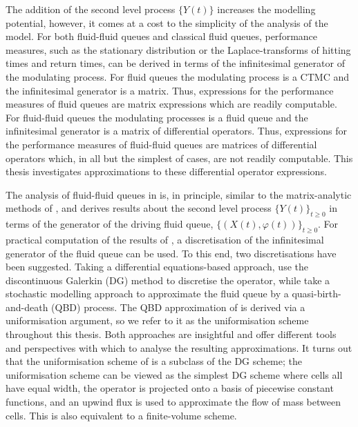 The addition of the second level process \(\{Y(t)\}\) increases the modelling potential, however, it comes at a cost to the simplicity of the analysis of the model. For both fluid-fluid queues and classical fluid queues, performance measures, such as the stationary distribution or the Laplace-transforms of hitting times and return times, can be derived in terms of the infinitesimal generator of the modulating process. For fluid queues the modulating process is a CTMC and the infinitesimal generator is a matrix. Thus, expressions for the performance measures of fluid queues are matrix expressions which are readily computable. For fluid-fluid queues the modulating processes is a fluid queue and the infinitesimal generator is a matrix of differential operators. Thus, expressions for the performance measures of fluid-fluid queues are matrices of differential operators which, in all but the simplest of cases, are not readily computable. This thesis investigates approximations to these differential operator expressions. 

The analysis of fluid-fluid queues in \cite{bo2014} is, in principle, similar to the matrix-analytic methods of \cite{bean2005}, and derives results about the second level process \(\{Y(t)\}_{t\geq0}\) in terms of the generator of the driving fluid queue, \(\{(X(t),\varphi(t))\}_{t\geq0}\). For practical computation of the results of \cite{bo2014}, a discretisation of the infinitesimal generator of the fluid queue can be used. To this end, two discretisations have been suggested. Taking a differential equations-based approach, \cite{blnos2022} use the discontinuous Galerkin (DG) method to discretise the operator, while \cite{bo2013} take a stochastic modelling approach to approximate the fluid queue by a quasi-birth-and-death (QBD) process. The QBD approximation of \cite{bo2013} is derived via a uniformisation argument, so we refer to it as the uniformisation scheme throughout this thesis. Both approaches are insightful and offer different tools and perspectives with which to analyse the resulting approximations. It turns out that the uniformisation scheme of \cite{bo2013} is a subclass of the DG scheme; the uniformisation scheme can be viewed as the simplest DG scheme where cells all have equal width, the operator is projected onto a basis of piecewise constant functions, and an upwind flux is used to approximate the flow of mass between cells. This is also equivalent to a finite-volume scheme.



